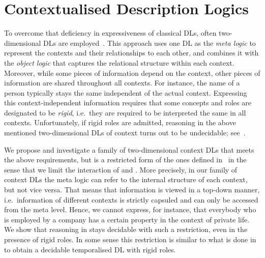 \section{Contextualised Description Logics}
\label{sec:intro-contextualised-description-logics}

To overcome that deficiency in expressiveness of classical DLs, often two-dimensional DLs are
employed~\cite{KG-JELIA10,KLGu-DL-11,KlGu-AAAI11,KG16}. This approach uses one DL \LM as the
\emph{meta logic} to represent the contexts and their relationships to each other, and combines it
with the \emph{object logic} \LO that captures the relational structure within each context.
%
Moreover, while some pieces of information depend on the context, other pieces of information are
shared throughout all contexts.  For instance, the name of a person typically stays the same
independent of the actual context.  Expressing this context-independent information requires that
some concepts and roles are designated to be \emph{rigid}, i.e.~they are required to be interpreted
the same in all contexts.  Unfortunately, if rigid roles are admitted, reasoning in the above
mentioned two-dimensional DLs of context turns out to be undecidable; see~\cite{KG-JELIA10}.

We propose and investigate a family of two-dimensional context DLs \LMLO that
meets the above requirements, but is a restricted form of the ones defined in~\cite{KG-JELIA10} in
the sense that we limit the interaction of \LM and \LO.  More precisely, in our family of
context DLs the meta logic can refer to the internal structure of each context, but not vice versa.
That means that information is viewed in a top-down manner, i.e.~information of different contexts
is strictly capsuled and can only be accessed from the meta level.  Hence, we cannot
express, for instance, that everybody who is employed by a company has a certain property in the
context of private life.  We show that reasoning in \LMLO stays decidable with
such a restriction, even in the presence of rigid roles.
%
In some sense this restriction is similar to what is done in~\cite{BaGL-KR08,BaGL-ToCL12,Lip-PhD14}
to obtain a decidable temporalised DL with rigid roles.  


